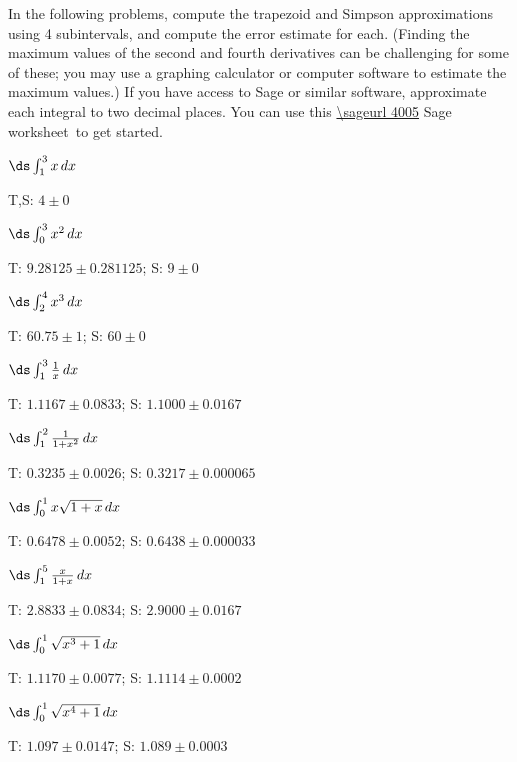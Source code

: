 \begin{exercises}

In the following problems, compute the trapezoid and Simpson
approximations using 4 subintervals, and compute the error estimate
for each. (Finding the maximum values of the second and fourth
derivatives can be challenging for some of these; you may use a
graphing calculator or computer software to estimate the maximum
values.)  If you have access to Sage or similar software, approximate
each integral to two decimal places.  You can use this
\expandafter\url\expandafter{\sageurl 4005}%
Sage worksheet\endurl\ to
get started.

\twocol

\exercise $\ds\int_1^3 x\,dx$
\begin{answer} T,S: $4\pm0$
\end{answer}

\exercise $\ds\int_0^3 x^2\,dx$
\begin{answer} T: $9.28125\pm0.281125 $; S: $9\pm0$
\end{answer}

\exercise $\ds\int_2^4 x^3\,dx$
\begin{answer} T: $60.75\pm1$; S: $60\pm0$
\end{answer}

\exercise $\ds\int_1^3 {1\over x}\,dx$
\begin{answer} T: $1.1167\pm 0.0833$; S: $1.1000\pm 0.0167$
\end{answer}

\exercise $\ds\int_1^2 {1\over 1+x^2}\,dx$
\begin{answer} T: $0.3235\pm 0.0026$; S: $0.3217\pm 0.000065$
\end{answer}

\exercise $\ds\int_0^1 x\sqrt{1+x}\,dx$
\begin{answer} T: $0.6478\pm 0.0052$; S: $0.6438\pm 0.000033$
\end{answer}

\exercise $\ds\int_1^5 {x\over 1+x}\,dx$
\begin{answer} T: $2.8833\pm 0.0834$; S: $2.9000\pm 0.0167$
\end{answer}

\exercise $\ds\int_0^1 \sqrt{x^3+1}\,dx$
\begin{answer} T: $1.1170\pm 0.0077$; S: $1.1114\pm 0.0002$
\end{answer}

\exercise $\ds\int_0^1 \sqrt{x^4+1}\,dx$
\begin{answer} T: $1.097\pm 0.0147$; S: $1.089\pm 0.0003$
\end{answer}


\end{exercises}
